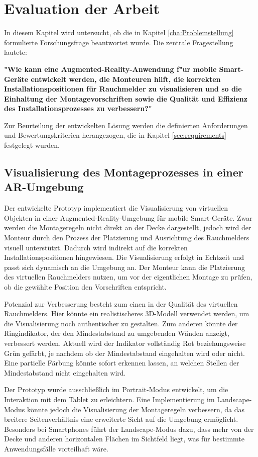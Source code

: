 \chapter{Evaluation der Arbeit}

In diesem Kapitel wird untersucht, ob die in Kapitel \ref{cha:Problemstellung} formulierte Forschungsfrage beantwortet wurde. Die zentrale Fragestellung lautete:

\textbf{"Wie kann eine Augmented-Reality-Anwendung f"ur mobile Smart-Geräte entwickelt werden, die Monteuren hilft, die korrekten Installationspositionen für Rauchmelder zu visualisieren und so die Einhaltung der Montagevorschriften sowie die Qualität und Effizienz des Installationsprozesses zu verbessern?"}

Zur Beurteilung der entwickelten Lösung werden die definierten Anforderungen und Bewertungskriterien herangezogen, die in Kapitel \ref{sec:requirements} festgelegt wurden.

\section{Visualisierung des Montageprozesses in einer AR-Umgebung}

Der entwickelte Prototyp implementiert die Visualisierung von virtuellen Objekten in einer Augmented-Reality-Umgebung für mobile Smart-Geräte. Zwar werden die Montageregeln nicht direkt an der Decke dargestellt, jedoch wird der Monteur durch den Prozess der Platzierung und Ausrichtung des Rauchmelders visuell unterstützt. Dadurch wird indirekt auf die korrekten Installationspositionen hingewiesen. Die Visualisierung erfolgt in Echtzeit und passt sich dynamisch an die Umgebung an. Der Monteur kann die Platzierung des virtuellen Rauchmelders nutzen, um vor der eigentlichen Montage zu prüfen, ob die gewählte Position den Vorschriften entspricht.

Potenzial zur Verbesserung besteht zum einen in der Qualität des virtuellen Rauchmelders. Hier könnte ein realistischeres 3D-Modell verwendet werden, um die Visualisierung noch authentischer zu gestalten. Zum anderen könnte der Ringindikator, der den Mindestabstand zu umgebenden Wänden anzeigt, verbessert werden. Aktuell wird der Indikator vollständig Rot beziehungsweise Grün gefärbt, je nachdem ob der Mindestabstand eingehalten wird oder nicht. Eine partielle Färbung könnte sofort erkennen lassen, an welchen Stellen der Mindestabstand nicht eingehalten wird.

Der Prototyp wurde ausschließlich im Portrait-Modus entwickelt, um die Interaktion mit dem Tablet zu erleichtern. Eine Implementierung im Landscape-Modus könnte jedoch die Visualisierung der Montageregeln verbessern, da das breitere Seitenverhältnis eine erweiterte Sicht auf die Umgebung ermöglicht. Besonders bei Smartphones führt der Landscape-Modus dazu, dass mehr von der Decke und anderen horizontalen Flächen im Sichtfeld liegt, was für bestimmte Anwendungsfälle vorteilhaft wäre.

